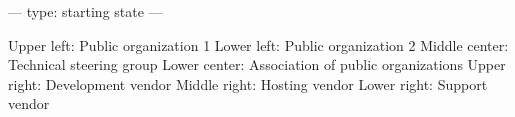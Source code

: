 ---
type: starting state
---

Upper left: Public organization 1
Lower left: Public organization 2
Middle center: Technical steering group
Lower center: Association of public organizations
Upper right: Development vendor
Middle right: Hosting vendor
Lower right: Support vendor
